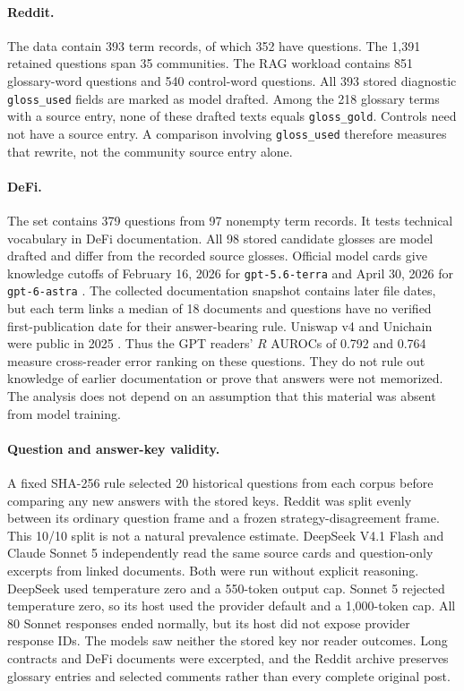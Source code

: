 \paragraph{Reddit.}
The data contain 393 term records, of which 352 have questions. The 1,391 retained questions span 35 communities. The RAG workload contains 851 glossary-word questions and 540 control-word questions. All 393 stored diagnostic \texttt{gloss\_used} fields are marked as model drafted. Among the 218 glossary terms with a source entry, none of these drafted texts equals \texttt{gloss\_gold}. Controls need not have a source entry. A comparison involving \texttt{gloss\_used} therefore measures that rewrite, not the community source entry alone.

\paragraph{DeFi.}
The set contains 379 questions from 97 nonempty term records. It tests technical vocabulary in DeFi documentation. All 98 stored candidate glosses are model drafted and differ from the recorded source glosses. Official model cards give knowledge cutoffs of February 16, 2026 for \texttt{gpt-5.6-terra} and April 30, 2026 for \texttt{gpt-6-astra} \citep{openai-gpt56-terra-model,openai-gpt6-astra-model}. The collected documentation snapshot contains later file dates, but each term links a median of 18 documents and questions have no verified first-publication date for their answer-bearing rule. Uniswap v4 and Unichain were public in 2025 \citep{uniswap-v4-launch,unichain-launch}. Thus the GPT readers' $R$ AUROCs of 0.792 and 0.764 measure cross-reader error ranking on these questions. They do not rule out knowledge of earlier documentation or prove that answers were not memorized. The analysis does not depend on an assumption that this material was absent from model training.

\paragraph{Question and answer-key validity.}\label{app:source-screen}
A fixed SHA-256 rule selected 20 historical questions from each corpus before comparing any new answers with the stored keys. Reddit was split evenly between its ordinary question frame and a frozen strategy-disagreement frame. This 10/10 split is not a natural prevalence estimate. DeepSeek V4.1 Flash and Claude Sonnet 5 independently read the same source cards and question-only excerpts from linked documents. Both were run without explicit reasoning. DeepSeek used temperature zero and a 550-token output cap. Sonnet 5 rejected temperature zero, so its host used the provider default and a 1,000-token cap. All 80 Sonnet responses ended normally, but its host did not expose provider response IDs. The models saw neither the stored key nor reader outcomes. Long contracts and DeFi documents were excerpted, and the Reddit archive preserves glossary entries and selected comments rather than every complete original post.

